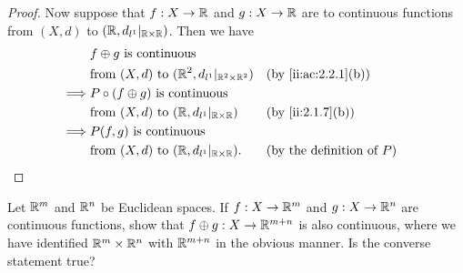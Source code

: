 \begin{proof}
  Now suppose that \(f : X \to \mathbb{R}\) and \(g : X \to \mathbb{R}\) are to continuous functions from \((X, d)\) to \((\mathbb{R}, d_{l^1}|_{\mathbb{R} \times \mathbb{R}})\).
  Then we have
  \begin{align*}
             & f \oplus g \text{ is continuous }                                                                            \\
             & \text{from } (X, d) \text{ to } (\R^2, d_{l^1}|_{\R^2 \times \R^2}) &  & \by{ii:ac:2.2.1}[b]                    \\
    \implies & P \circ (f \oplus g) \text{ is continuous }                                                                  \\
             & \text{from } (X, d) \text{ to } (\R, d_{l^1}|_{\R \times \R})       &  & \by{ii:2.1.7}[b]                       \\
    \implies & P(f, g) \text{ is continuous }                                                                               \\
             & \text{from } (X, d) \text{ to } (\R, d_{l^1}|_{\R \times \R}).      &  & \text{(by the definition of \(P\))}
  \end{align*}
\end{proof}

\begin{ex}\label{ii:ex:2.2.6}
  Let \(\mathbb{R}^m\) and \(\mathbb{R}^n\) be Euclidean spaces.
  If \(f : X \to \mathbb{R}^m\) and \(g : X \to \mathbb{R}^n\) are continuous functions, show that \(f \oplus g : X \to \mathbb{R}^{m + n}\) is also continuous, where we have identified \(\mathbb{R}^m \times \mathbb{R}^n\) with \(\mathbb{R}^{m + n}\) in the obvious manner.
  Is the converse statement true?
\end{ex}

